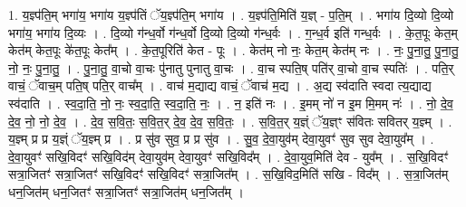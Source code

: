\documentclass[17pt]{extarticle}
\begin{document}
1. य॒ज्ञ्प॑ति॒म् भगा॑य॒ भगा॑य य॒ज्ञ्प॑तिं ॅय॒ज्ञ्प॑ति॒म् भगा॑य । . य॒ज्ञ्प॑ति॒मिति॑ य॒ज्ञ् - प॒ति॒म् । . भगा॑य दि॒व्यो दि॒व्यो भगा॑य॒ भगा॑य दि॒व्यः । . दि॒व्यो ग॑न्ध॒र्वो ग॑न्ध॒र्वो दि॒व्यो दि॒व्यो ग॑न्ध॒र्वः । . ग॒न्ध॒र्व इति॑ गन्ध॒र्वः । . के॒त॒पूः केत॒म् केत॑म् केत॒पूः के॑त॒पूः केत᳚म् । . के॒त॒पूरिति॑ केत - पूः । . केत॑म् नो नः॒ केत॒म् केत॑म् नः । . नः॒ पु॒ना॒तु॒ पु॒ना॒तु॒ नो॒ नः॒ पु॒ना॒तु॒ । . पु॒ना॒तु॒ वा॒चो वा॒चः पु॑नातु पुनातु वा॒चः । . वा॒च स्पति॒ष् पति॑र् वा॒चो वा॒च स्पतिः॑ । . पति॒र् वाचं॒ ॅवाच॒म् पति॒ष् पति॒र् वाच᳚म् । . वाच॑ म॒द्याद्य वाचं॒ ॅवाच॑ म॒द्य । . अ॒द्य स्व॑दाति स्वदा त्य॒द्याद्य स्व॑दाति । . स्व॒दा॒ति॒ नो॒ नः॒ स्व॒दा॒ति॒ स्व॒दा॒ति॒ नः॒ । . न॒ इति॑ नः । . इ॒मम् नो॑ न इ॒म मि॒मम् नः॑ । . नो॒ दे॒व॒ दे॒व॒ नो॒ नो॒ दे॒व॒ । . दे॒व॒ स॒वि॒तः॒ स॒वि॒त॒र् दे॒व॒ दे॒व॒ स॒वि॒तः॒ । . स॒वि॒त॒र् य॒ज्ञ्ं ॅय॒ज्ञ्ꣳ स॑वितः सवितर् य॒ज्ञ्म् । . य॒ज्ञ्म् प्र प्र य॒ज्ञ्ं ॅय॒ज्ञ्म् प्र । . प्र सु॑व सुव॒ प्र प्र सु॑व । . सु॒व॒ दे॒वा॒युव॑म् देवा॒युवꣳ॑ सुव सुव देवा॒युव᳚म् । . दे॒वा॒युवꣳ॑ सखि॒विदꣳ॑ सखि॒विद॑म् देवा॒युव॑म् देवा॒युवꣳ॑ सखि॒विद᳚म् । . दे॒वा॒युव॒मिति॑ देव - युव᳚म् । . स॒खि॒विदꣳ॑ सत्रा॒जितꣳ॑ सत्रा॒जितꣳ॑ सखि॒विदꣳ॑ सखि॒विदꣳ॑ सत्रा॒जित᳚म् । . स॒खि॒विद॒मिति॑ सखि - विद᳚म् । . स॒त्रा॒जित॑म् धन॒जित॑म् धन॒जितꣳ॑ सत्रा॒जितꣳ॑ सत्रा॒जित॑म् धन॒जित᳚म् । \newline
\end{document}
